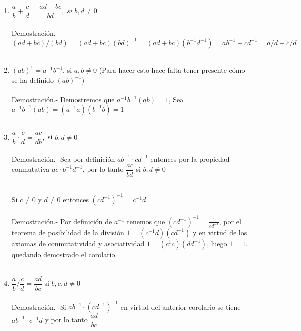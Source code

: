 \begin{enumerate}[\bfseries 1.]
\begin{enumerate}[\bfseries i)]
\item $\dfrac{a}{b} + \dfrac{c}{d} = \dfrac{ad+bc}{bd}, \; si \; b,d \neq 0$\\\\
    Demostración.- \; $(ad+bc)/(bd)=(ad+bc)(bd)^{-1}=(ad + bc)(b^{-1}d^{-1})=ab^{-1} + cd^{-1}=a/d + c/d$\\\\

\item $(ab)^{1} = a^{-1} b^{-1}$, si $a,b \neq 0$ (Para hacer esto hace falta tener presente cómo se ha definido $(ab)^{-1}$)\\\\
Demostración.- \; Demostremos que  $a^{-1} b^{-1} (ab) = 1$, Sea $a^{-1} b^{-1} (ab) = \left( a^{-1} a \right)\left( b^{-1} b \right) = 1$\\\\

\item $\dfrac{a}{b} \cdot \dfrac{c}{d} = \dfrac{ac}{db},$ si $b,d \neq 0$\\\\
Demostración.- \; Sea por definición $ab^{-1} \cdot cd^{-1}$ entonces  por la propiedad conmutativa $ac \cdot b^{-1}d^{-1}$, por lo tanto $\dfrac{ac}{bd}$ si $b,d \neq 0$\\\\
\begin{cor}
Si $c\neq 0$ y $d\neq 0$ entonces $(cd^{-1})^{-1}=c^{-1}d$\\\\
Demostración.- \;
Por definición de $a^{-1}$ tenemos que $(cd^{-1})^{-1}=\displaystyle\frac{1}{cd^{-1}}$, por el teorema de posibilidad de la división $1=(c^{-1}d)(cd^{-1})$ y en virtud de los axiomas de conmutatividad y asociatividad $1=(c^{1}c)(dd^{-1})$, luego $1=1$. quedando demostrado el corolario.\\\\
\end{cor}

\item $\dfrac{a}{b} / \dfrac{c}{d} = \dfrac{ad}{bc}$ si $b,c,d \neq 0$\\\\
Demostración.- \; Si $ab^{-1} \cdot \left( cd^{-1}\right)^{-1}$ en virtud del anterior corolario se tiene $ab^{-1}\cdot c^{-1}d$ y por lo tanto $\dfrac{ad}{bc}$ \\\\


\end{enumerate}
\end{enumerate}
